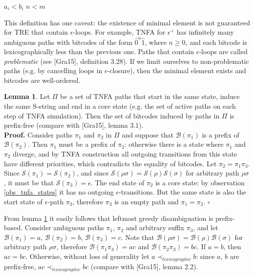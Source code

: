 \documentclass{article}
\newcommand{\Xeq}{\!=\!}
\newcommand{\XB}{\mathcal{B}}
\newcommand{\XS}{\mathcal{S}}
\theoremstyle{definition}
\newtheorem{XLem}{Lemma}
\begin{document}
\begin{multicols}{2}
    \begin{algorithm}[H] \DontPrintSemicolon {} 
     {
        \For {$i \Xeq \overline{1, min(n, m)}$} {
             { \Return $a_i \!<\! b_i$  }
        }
        \Return $n \!<\! m$ \;
    }
    \end{algorithm}

This definition has one caveat: the existence of minimal element is not guaranteed for TRE that contain $\epsilon$-loops.
For example, TNFA for $\epsilon^+$ has infinitely many ambiguous paths with bitcodes
of the form $\widehat{0}^n \widehat{1}$, where $n \!\geq\! 0$,
and each bitcode is lexicographically less than the previous one.
Paths that contain $\epsilon$-loops are called \emph{problematic} (see [Gra15], definition 3.28).
If we limit ourselves to non-problematic paths (e.g. by cancelling loops in $\epsilon$-closure),
then the minimal element exists and bitcodes are well-ordered.

\begin{XLem}\label{lemma_bitcodes}
Let $\Pi$ be a set of TNFA paths that start in the same state, induce the same S-string and end in a core state
(e.g. the set of active paths on each step of TNFA simulation).
Then the set of bitcodes induced by paths in $\Pi$ is prefix-free
(compare with [Gra15], lemma 3.1).
\\[0.5em]
\textbf{Proof.}
Consider paths $\pi_1$ and $\pi_2$ in $\Pi$
and suppose that $\XB(\pi_1)$ is a prefix of $\XB(\pi_2)$.
Then $\pi_1$ must be a prefix of $\pi_2$: otherwise there is a state where $\pi_1$ and $\pi_2$ diverge,
and by TNFA construction all outgoing transitions from this state have different priorities,
which contradicts the equality of bitcodes.
Let $\pi_2 \Xeq \pi_1 \pi_3$.
Since $\XS(\pi_1) \Xeq \XS(\pi_2)$, and since $\XS(\rho\sigma) \Xeq \XS(\rho)\XS(\sigma)$ for arbitrary path $\rho\sigma$,
it must be that $\XS(\pi_3) \Xeq \epsilon$.
The end state of $\pi_2$ is a core state: by observation \ref{obs_tnfa_states} it has no outgoing $\epsilon$-transitions.
But the same state is also the start state of $\epsilon$-path $\pi_3$, therefore $\pi_3$ is an empty path and $\pi_1 \Xeq \pi_2$.
$\square$
\end{XLem}

From lemma \ref{lemma_bitcodes} it easily follows that leftmost greedy disambiguation is prefix-based.
Consider ambiguous paths $\pi_1$, $\pi_2$ and arbitrary suffix $\pi_3$,
and let $\XB(\pi_1) \Xeq a$, $\XB(\pi_2) \Xeq b$, $\XB(\pi_3) \Xeq c$.
Note that $\XB(\rho\sigma) \Xeq \XB(\rho)\XB(\sigma)$ for arbitrary path $\rho\sigma$,
therefore $\XB(\pi_1\pi_3) \Xeq ac$ and $\XB(\pi_2\pi_3) \Xeq bc$.
If $a \Xeq b$, then $ac \Xeq bc$.
Otherwise, without loss of generality let $a \prec_{lexicographic} b$: since $a$, $b$ are prefix-free, $ac \prec_{lexicographic} bc$
(compare with [Gra15], lemma 2.2).
\\


\end{multicols}
\end{document}
